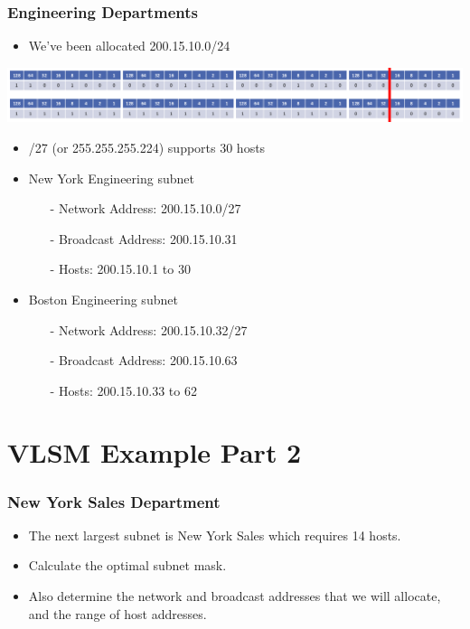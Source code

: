 \documentclass[pdflatex,compress]{beamer}
\begin{document}
\begin{frame}
	\frametitle{Engineering Departments}
	\begin{itemize}
		\item We've been allocated 200.15.10.0/24
	\end{itemize}
	\begin{center}
		\includegraphics[width=\linewidth]{img/img10}
	\end{center}
	\begin{itemize}
		\item /27 (or 255.255.255.224) supports 30 hosts
	\end{itemize}
	\begin{multicols}{2}
		\begin{itemize}
			\item New York Engineering subnet
			\begin{itemize}
				\item[-] Network Address: 200.15.10.0/27
				\item[-] Broadcast Address: 200.15.10.31
				\item[-] Hosts: 200.15.10.1 to 30
			\end{itemize}
			\item Boston Engineering subnet
			\begin{itemize}
				\item[-] Network Address: 200.15.10.32/27
				\item[-] Broadcast Address: 200.15.10.63
				\item[-] Hosts: 200.15.10.33 to 62
			\end{itemize}
		\end{itemize}
	\end{multicols}
\end{frame}

\section{VLSM Example Part 2}

\begin{frame}
	\frametitle{New York Sales Department}
	\begin{itemize}
		\item The next largest subnet is New York Sales which requires 14 hosts.
		\item Calculate the optimal subnet mask.
		\item Also determine the network and broadcast addresses that we will allocate, and the range of host addresses.
	\end{itemize}
\end{frame}
\end{document}
